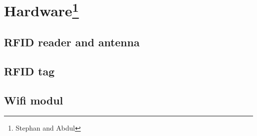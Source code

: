 \section[Hardware]{Hardware\footnote{Stephan and Abdul}}

\subsection{RFID reader and antenna}

\subsection{RFID tag}

\subsection{Wifi modul}